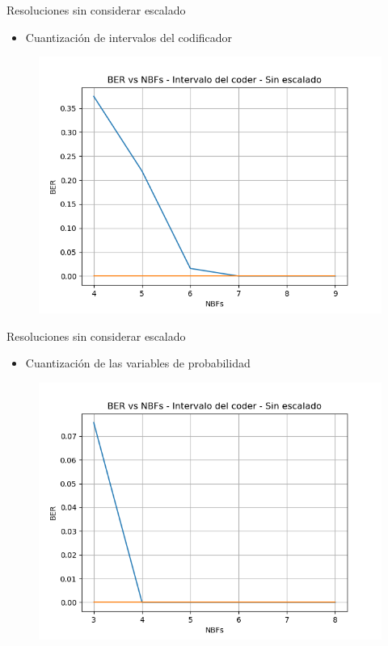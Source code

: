 \documentclass[xcolor=table]{beamer}
\begin{document}
\begin{frame}{Resoluciones sin considerar escalado}
\begin{itemize}
    \item Cuantización de intervalos del codificador 
\end{itemize}
    \begin{figure}
  \centering
  \includegraphics[width=0.60\paperwidth]{Graficos/cuantization4.png}%
\end{figure}
\end{frame}

\begin{frame}{Resoluciones sin considerar escalado}
    \begin{itemize}
        \item Cuantización de las variables de probabilidad 
    \end{itemize}
     
    \begin{figure}
  \centering
  \includegraphics[width=0.60\paperwidth]{Graficos/cuantization5.png}%
\end{figure}
\end{frame}
\end{document}
